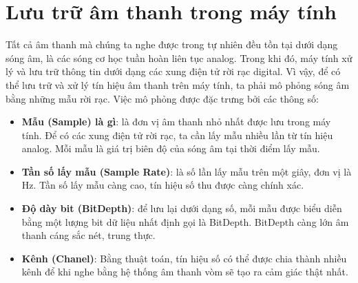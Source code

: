 \section{Lưu trữ âm thanh trong máy tính}
Tất cả âm thanh mà chúng ta nghe được trong tự nhiên đều tồn tại dưới dạng sóng âm, là các sóng cơ học tuần hoàn liên tục analog. Trong khi đó, máy tính xử lý và lưu trữ thông tin dưới dạng các xung điện tử rời rạc digital. Vì vậy, để có thể lưu trữ và xử lý tín hiệu âm thanh trên máy tính, ta phải mô phỏng sóng âm bằng những mẫu rời rạc. Việc mô phỏng được đặc trưng bởi các thông số:
\begin{itemize}
	\item \textbf{Mẫu (Sample) là gì}: là đơn vị âm thanh nhỏ nhất được lưu trong máy tính. Để có các xung điện tử rời rạc, ta cần lấy mẫu nhiều lần từ tín hiệu analog. Mỗi mẫu là giá trị biên độ của sóng âm tại thời điểm lấy mẫu.
	\item \textbf{Tần số lấy mẫu (Sample Rate)}: là số lần lấy mẫu trên một giây, đơn vị là Hz. Tần số lấy mẫu càng cao, tín hiệu số thu được càng chính xác.
	\item \textbf{Độ dày bit (BitDepth)}: để lưu lại dưới dạng số, mỗi mẫu được biểu diễn bằng một lượng bit dữ liệu nhất định gọi là BitDepth. BitDepth càng lớn âm thanh cáng sắc nét, trung thực.
	\item \textbf{Kênh (Chanel)}: Bằng thuật toán, tín hiệu số có thể được chia thành nhiều kênh để khi nghe bằng hệ thống âm thanh vòm sẽ tạo ra cảm giác thật nhất.
\end{itemize}

